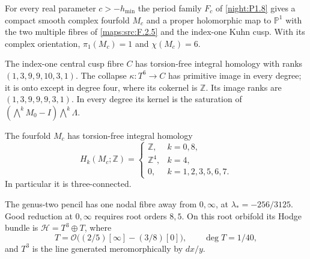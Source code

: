 \begin{theorem}\hypertarget{tag-02QJ}{}\label{night:P1.10}
For every real parameter $c>-h_{\min}$ the period family $F_c$ of \cref{night:P1.8} gives a compact smooth complex fourfold $M_c$ and a proper holomorphic map
to $\mathbb P^1$ with the two multiple fibres of \cref{maps:src:F.2.5} and the
index-one Kuhn cusp.  With its complex orientation,
$\pi_1(M_c)=1$ and $\chi(M_c)=6$.
\end{theorem}

\begin{theorem}\hypertarget{tag-02QK}{}\label{night:P1.11}
The index-one central cusp fibre $C$ has torsion-free integral homology
with ranks $(1,3,9,9,10,3,1)$.
The collapse $\kappa:T^6\to C$ has primitive image in every degree;
it is onto except in degree four, where its cokernel is $\mathbb Z$.
Its image ranks are $(1,3,9,9,9,3,1)$.
In every degree its kernel is the saturation of
$(\bigwedge^kM_0-I)\bigwedge^k\Lambda$.
\end{theorem}

\begin{theorem}\hypertarget{tag-02QL}{}\label{night:P1.12}
The fourfold $M_c$ has torsion-free integral homology
\[
H_k(M_c;\mathbb Z)=
\begin{cases}
\mathbb Z,&k=0,8,\\
\mathbb Z^4,&k=4,\\
0,&k=1,2,3,5,6,7.
\end{cases}
\]
In particular it is three-connected.
\end{theorem}

\begin{theorem}\hypertarget{tag-02QV}{}\label{night:P1.4}
The genus-two pencil has one nodal fibre away from $0,\infty$, at
$\lambda_*=-256/3125$.  Good reduction at $0,\infty$ requires root
orders $8,5$.  On this root orbifold its Hodge bundle is
$\mathcal H=T^3\oplus T$, where
\[
T=\mathcal O\bigl((2/5)[\infty]-(3/8)[0]\bigr),\qquad
\deg T=1/40,
\]
and $T^3$ is the line generated meromorphically by $dx/y$.
\end{theorem}

